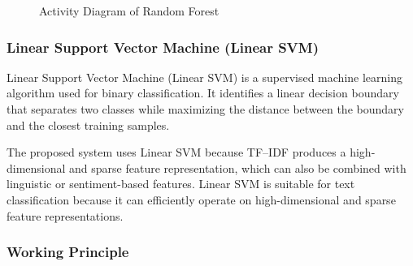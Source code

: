 \documentclass[12pt,a4paper]{report}
\begin{document}
\begin{figure}[H]

\caption{Activity Diagram of Random Forest}
\label{fig:random_forest_activity}
\end{figure}



\subsubsection*{Linear Support Vector Machine (Linear SVM)}

Linear Support Vector Machine (Linear SVM) is a supervised machine learning algorithm used for binary classification. It identifies a linear decision boundary that separates two classes while maximizing the distance between the boundary and the closest training samples.

The proposed system uses Linear SVM because TF--IDF produces a high-dimensional and sparse feature representation, which can also be combined with linguistic or sentiment-based features. Linear SVM is suitable for text classification because it can efficiently operate on high-dimensional and sparse feature representations.

\subsubsection*{Working Principle}
\end{document}
